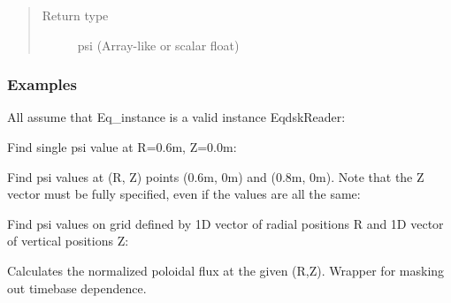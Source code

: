 \documentclass[letterpaper,10pt,english]{sphinxmanual}
\begin{document}
\begin{fulllineitems}
\begin{fulllineitems}
\begin{quote}
\begin{description}
\item[{Return type}] \leavevmode
psi (Array-like or scalar float)

\end{description}\end{quote}
\subsubsection*{Examples}

All assume that Eq\_instance is a valid instance EqdskReader:

Find single psi value at R=0.6m, Z=0.0m:

\begin{sphinxVerbatim}[commandchars=\\\{\}]
   
\end{sphinxVerbatim}

Find psi values at (R, Z) points (0.6m, 0m) and (0.8m, 0m).
Note that the Z vector must be fully specified,
even if the values are all the same:

\begin{sphinxVerbatim}[commandchars=\\\{\}]
  \PYG{p}{[} \PYG{p}{]} \PYG{p}{[} \PYG{p}{]}
\end{sphinxVerbatim}

Find psi values on grid defined by 1D vector of radial positions
R and 1D vector of vertical positions Z:

\begin{sphinxVerbatim}[commandchars=\\\{\}]
    
\end{sphinxVerbatim}

\end{fulllineitems}


\begin{fulllineitems}
\label{\detokenize{eqtools:eqtools.eqdskreader.EqdskReader.rz2psinorm}}
Calculates the normalized poloidal flux at the given (R,Z).
Wrapper for
{\hyperref[\detokenize{eqtools:eqtools.core.Equilibrium.rz2psinorm}]{}}
masking out timebase dependence.


\end{fulllineitems}
\end{fulllineitems}
\end{document}
